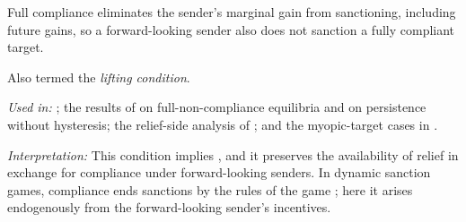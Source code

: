 \begin{assumption}
\label{ass:placability}
Full compliance eliminates the sender's marginal gain from sanctioning, including
future gains, so a forward-looking sender also does not sanction a fully compliant
target.
\end{assumption}
\noindent Also termed the \emph{lifting condition}.\par
\noindent\textit{Used in:} ; the results of
 on full-non-compliance equilibria and on persistence without
hysteresis; the relief-side analysis of ; and the
myopic-target cases in .\par
\noindent\textit{Interpretation:} This condition implies ,
and it preserves the availability of relief in exchange for compliance under
forward-looking senders. In dynamic sanction games, compliance ends sanctions by the
rules of the game \citep[p.~914]{Eaton1992}; here it arises endogenously from the
forward-looking sender's incentives.

